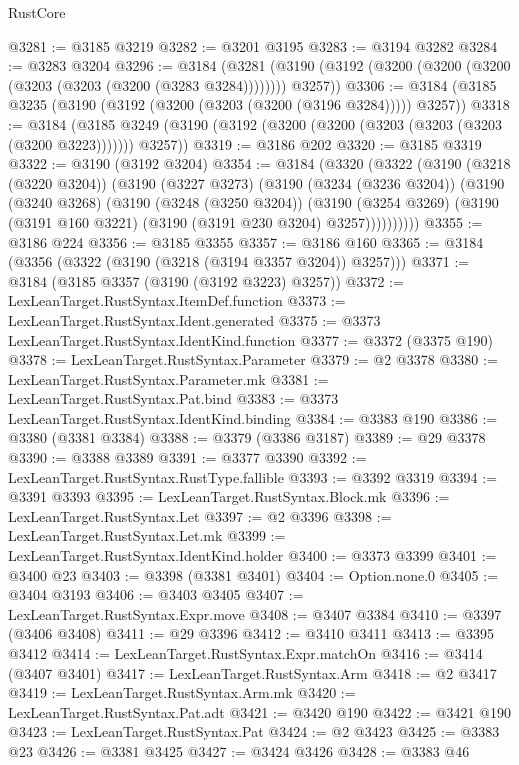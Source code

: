\begin{lexlean}{RustCore}
\begin{coremodule}
@3281 := @3185 @3219
@3282 := @3201 @3195
@3283 := @3194 @3282
@3284 := @3283 @3204
@3296 := @3184
    (@3281 (@3190 (@3192 (@3200 (@3200 (@3200 (@3203 (@3203 (@3200 (@3283 @3284)))))))) @3257))
@3306 := @3184 (@3185 @3235 (@3190 (@3192 (@3200 (@3203 (@3200 (@3196 @3284))))) @3257))
@3318 := @3184
    (@3185 @3249 (@3190 (@3192 (@3200 (@3200 (@3203 (@3203 (@3203 (@3200 @3223))))))) @3257))
@3319 := @3186 @202
@3320 := @3185 @3319
@3322 := @3190 (@3192 @3204)
@3354 := @3184
    (@3320
      (@3322
        (@3190
          (@3218 (@3220 @3204))
          (@3190
            (@3227 @3273)
            (@3190
              (@3234 (@3236 @3204))
              (@3190
                (@3240 @3268)
                (@3190
                  (@3248 (@3250 @3204))
                  (@3190
                    (@3254 @3269)
                    (@3190 (@3191 @160 @3221) (@3190 (@3191 @230 @3204) @3257))))))))))
@3355 := @3186 @224
@3356 := @3185 @3355
@3357 := @3186 @160
@3365 := @3184 (@3356 (@3322 (@3190 (@3218 (@3194 @3357 @3204)) @3257)))
@3371 := @3184 (@3185 @3357 (@3190 (@3192 @3223) @3257))
@3372 := LexLeanTarget.RustSyntax.ItemDef.function
@3373 := LexLeanTarget.RustSyntax.Ident.generated
@3375 := @3373 LexLeanTarget.RustSyntax.IdentKind.function
@3377 := @3372 (@3375 @190)
@3378 := LexLeanTarget.RustSyntax.Parameter
@3379 := @2 @3378
@3380 := LexLeanTarget.RustSyntax.Parameter.mk
@3381 := LexLeanTarget.RustSyntax.Pat.bind
@3383 := @3373 LexLeanTarget.RustSyntax.IdentKind.binding
@3384 := @3383 @190
@3386 := @3380 (@3381 @3384)
@3388 := @3379 (@3386 @3187)
@3389 := @29 @3378
@3390 := @3388 @3389
@3391 := @3377 @3390
@3392 := LexLeanTarget.RustSyntax.RustType.fallible
@3393 := @3392 @3319
@3394 := @3391 @3393
@3395 := LexLeanTarget.RustSyntax.Block.mk
@3396 := LexLeanTarget.RustSyntax.Let
@3397 := @2 @3396
@3398 := LexLeanTarget.RustSyntax.Let.mk
@3399 := LexLeanTarget.RustSyntax.IdentKind.holder
@3400 := @3373 @3399
@3401 := @3400 @23
@3403 := @3398 (@3381 @3401)
@3404 := Option.none.{0}
@3405 := @3404 @3193
@3406 := @3403 @3405
@3407 := LexLeanTarget.RustSyntax.Expr.move
@3408 := @3407 @3384
@3410 := @3397 (@3406 @3408)
@3411 := @29 @3396
@3412 := @3410 @3411
@3413 := @3395 @3412
@3414 := LexLeanTarget.RustSyntax.Expr.matchOn
@3416 := @3414 (@3407 @3401)
@3417 := LexLeanTarget.RustSyntax.Arm
@3418 := @2 @3417
@3419 := LexLeanTarget.RustSyntax.Arm.mk
@3420 := LexLeanTarget.RustSyntax.Pat.adt
@3421 := @3420 @190
@3422 := @3421 @190
@3423 := LexLeanTarget.RustSyntax.Pat
@3424 := @2 @3423
@3425 := @3383 @23
@3426 := @3381 @3425
@3427 := @3424 @3426
@3428 := @3383 @46

\end{coremodule}
\end{lexlean}
